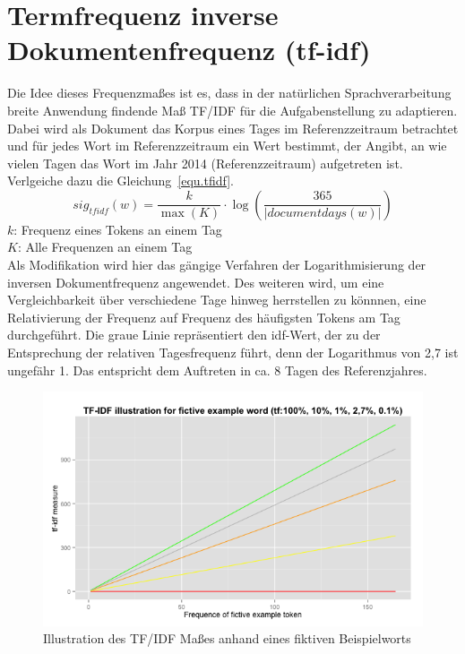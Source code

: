 \section{Termfrequenz inverse Dokumentenfrequenz (tf-idf)}
Die Idee dieses Frequenzmaßes ist es, dass in der natürlichen Sprachverarbeitung breite Anwendung findende Maß TF/IDF für die Aufgabenstellung zu adaptieren. Dabei wird als Dokument das Korpus eines Tages im Referenzzeitraum betrachtet und für jedes Wort im Referenzzeitraum ein Wert bestimmt, der Angibt, an wie vielen Tagen das Wort im Jahr 2014 (Referenzzeitraum) aufgetreten ist. Verlgeiche dazu die Gleichung~\ref{equ.tfidf}.\\
\begin{equation}\label{equ.tfidf}
sig_{tf idf}(w) = \frac{k}{\max(K)} \cdot \log ( \frac{365}{|documentdays(w)|})
\end{equation}
$k$: Frequenz eines Tokens an einem Tag\\
$K$: Alle Frequenzen an einem Tag\\
Als Modifikation wird hier das gängige Verfahren der Logarithmisierung der inversen Dokumentfrequenz angewendet. Des weiteren wird, um eine Vergleichbarkeit über verschiedene Tage hinweg herrstellen zu könnnen, eine Relativierung der Frequenz auf Frequenz des häufigsten Tokens am Tag durchgeführt. Die graue Linie repräsentiert den idf-Wert, der zu der Entsprechung der relativen Tagesfrequenz führt, denn der Logarithmus von 2,7 ist ungefähr 1. Das entspricht dem Auftreten in ca. 8 Tagen des Referenzjahres.\\
\begin{figure}[h!]
    \centering
    \includegraphics[width=1\textwidth]{pictures/tfidfIllustration.png}
    \caption{Illustration des TF/IDF Maßes anhand eines fiktiven Beispielworts}\label{pic.tfid_mass}
\end{figure}
